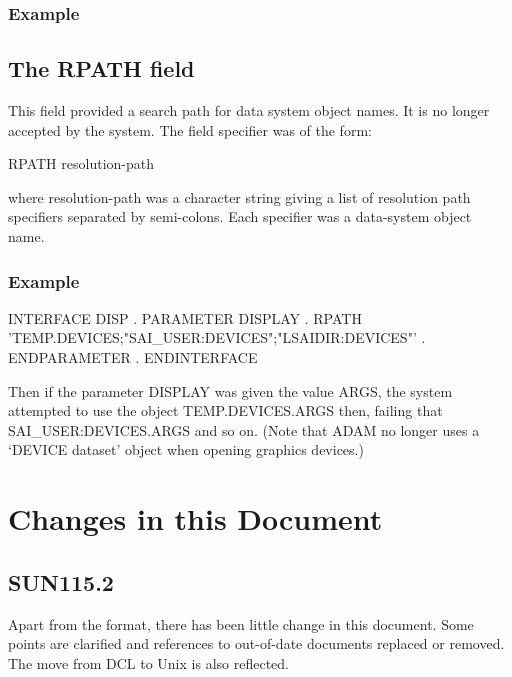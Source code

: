 \documentclass[twoside,11pt,nolof]{starlink}
\begin{document}
\subsubsection*{Example}

\subsection{The RPATH field}

This field provided a search path for data system object names.
It is no longer accepted by the system.
The field specifier was of the form:
\begin{terminalv}
RPATH resolution-path
\end{terminalv}
where resolution-path was a character string giving a list of resolution path
specifiers separated by semi-colons.
Each specifier was a data-system object name.

\subsubsection*{Example}
\begin{terminalv}
INTERFACE DISP
      .
   PARAMETER DISPLAY
         .
      RPATH 'TEMP.DEVICES;"SAI_USER:DEVICES";"LSAIDIR:DEVICES"'
         .
   ENDPARAMETER
      .
ENDINTERFACE
\end{terminalv}
Then if the parameter DISPLAY was given the value ARGS, the system
attempted to use the object TEMP.DEVICES.ARGS then, failing that
SAI\_USER:DEVICES.ARGS and so on.
(Note that ADAM no longer uses a `DEVICE dataset' object when opening graphics
devices.)

\newpage
\section{Changes in this Document}
\subsection{SUN115.2}
Apart from the format, there has been little change in this document.
Some points are clarified and references to out-of-date documents replaced or
removed. The move from DCL to Unix is also reflected.
\end{document}
